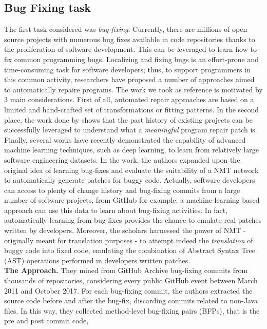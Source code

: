 \subsection{Bug Fixing task}
The first task considered was \textit{bug-fixing}.
Currently, there are millions of open source projects with numerous bug fixes available in code repositories
thanks to the proliferation of software development. This can be leveraged to learn how to fix common programming bugs. 
Localizing and fixing bugs is an effort-prone and time-consuming task for software developers;
thus, to support programmers in this common activity, researchers have proposed a number of approaches aimed to automatically repaire programs.
The work we took as reference is motivated by 3 main considerations. 
First of all, automated repair approaches are based on a limited and hand-crafted
set of transformations or fitting patterns. 
In the second place, the work done by \cite{le2016history} shows that the past history of 
existing projects can be successfully leveraged to understand what a \textit{meaningful} program repair patch is. 
Finally, several works have recently demonstrated the capability of advanced machine learning techniques, such as deep learning, to learn from relatively large software engineering
datasets. 
In the work, the authors expanded upon the original idea of learning bug-fixes and evaluate the suitability of a NMT network to automatically
generate patches for buggy code.
Actually, software developers can access to plenty of change history and 
bug-fixing commits from a large number of software projects, from GitHub for example;
a machine-learning based approach can use this data to learn about 
bug-fixing activities. In fact, automatically learning from bug-fixes provides the 
chance to emulate real patches written by developers. 
Moreover, the scholars harnessed the power of NMT - originally meant for translation purposes -
to attempt indeed the \textit{translation} of buggy code into fixed code, emulating 
the combination of Abstract Syntax Tree (AST) operations performed in developers written patches.\\
\newline
\textbf{The Approach.} They mined from GitHub Archive \cite{grigorik2012github} bug-fixing commits 
from thousands of repositories, considering every public GitHub event between March 2011 and 
October 2017. For each bug-fixing commit, the authors extracted the source code before and 
after the bug-fix, discarding commits related to non-Java files. In this way, they 
collected method-level bug-fixing pairs (BFPs), that is the pre and post commit code, 
